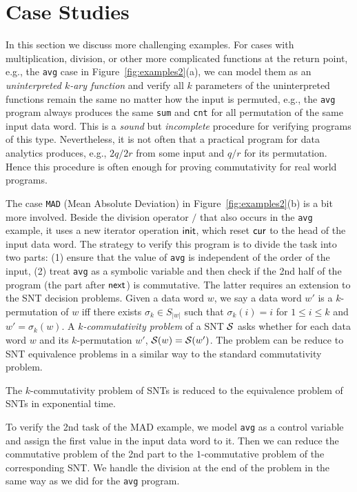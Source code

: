 \section{Case Studies}
\label{sec:cases}


	
In this section we discuss more challenging examples. 
For cases with multiplication, division, or other more complicated functions at the return point, e.g., the \texttt{avg} case in Figure~\ref{fig:examples2}(a), we can model them as an \emph{uninterpreted $k$-ary function} and verify all $k$ parameters of the uninterpreted functions remain the same no matter how the input is permuted, e.g., the \texttt{avg} program always produces the same \texttt{sum} and \texttt{cnt} for all permutation of the same input data word. This is a \emph{sound} but \emph{incomplete} procedure for verifying programs of this type. Nevertheless, it is not often that a  practical program for data analytics produces, e.g., $2q/2r$ from some input and $q/r$ for its permutation. Hence this procedure is often enough for proving commutativity for real world programs.

The case \texttt{MAD} (Mean Absolute Deviation) in Figure~\ref{fig:examples2}(b) is a bit more involved. Beside the division operator $/$ that also occurs in the \texttt{avg} example, it uses a new iterator operation $\mathsf{init}$, which reset $\mathsf{cur}$ to the head of the input data word. The strategy to verify this program is to divide the task into two parts: (1) ensure that the value of \texttt{avg} is independent of the order of the input, (2) treat \texttt{avg} as a symbolic variable and then check if the 2nd half of the program (the part after $\mathsf{next}$) is commutative. The latter requires an extension to the SNT decision problems. Given a data word $w$, we say a data word $w'$ is a $k$-permutation of $w$ iff there exists $\sigma_k\in S_{|w|}$ such that $\sigma_k(i)=i$ for $1\leq i\leq k$ and $w'=\sigma_k(w)$. A \emph{$k$-commutativity problem} of a SNT ${\mathcal{S} }$ asks whether for each data word $w$ and its $k$-permutation $w'$, ${\mathcal{S} }(w)={\mathcal{S} }(w')$. The problem can be reduce to SNT equivalence problems in a similar way to the standard commutativity problem.

\begin{proposition}\label{prop-snt-kcmm-to-eqv}
	The $k$-commutativity problem of SNTs is reduced to the equivalence problem of SNTs in exponential time. 
\end{proposition}

To verify the 2nd task of the MAD example, we model \texttt{avg} as a control variable and assign the first value in the input data word to it. Then we can reduce the commutative problem of the 2nd part to the $1$-commutative problem of the corresponding SNT. We handle the division at the end of the problem in the same way as we did for the \texttt{avg} program.

